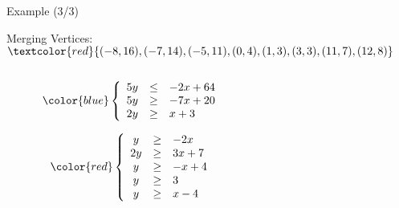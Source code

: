 \begin{frame}{Example (3/3)}
	\begin{block}{Merging}
		Vertices: $\textcolor{red}{(-8,16),(-7,14),(-5,11),(0,4),(1,3),(3,3),(11,7),(12,8)}$
		\begin{columns}
			\begin{column}{0.2\textwidth}
				\begin{center}
					\begin{equation*}
						\color{blue}
						\left\{   \begin{array}{crl}
							5y &\le& -2x + 64\\ 
							5y &\ge& -7x + 20\\
							2y &\ge& x + 3
						\end{array}
						\right.
					\end{equation*}
					\smallskip
					
					
					\begin{equation*}
						\color{red}
						\left\{   \begin{array}{crl}
							y &\ge& -2x\\
							2y &\ge& 3x + 7\\
							y &\ge& -x + 4\\
							y &\ge& 3\\
							y &\ge& x - 4
						\end{array}
						\right.
					\end{equation*}
					
				\end{center}
				
			\end{column}
			\hfill
			\begin{column}{0.8\textwidth}
				
				
				\begin{center}
					\begin{figure}[H]
						\scalebox{.7}{}
					\end{figure}
					
				\end{center}
				
			\end{column}
		\end{columns}
		
	\end{block}
	
	
\end{frame}
